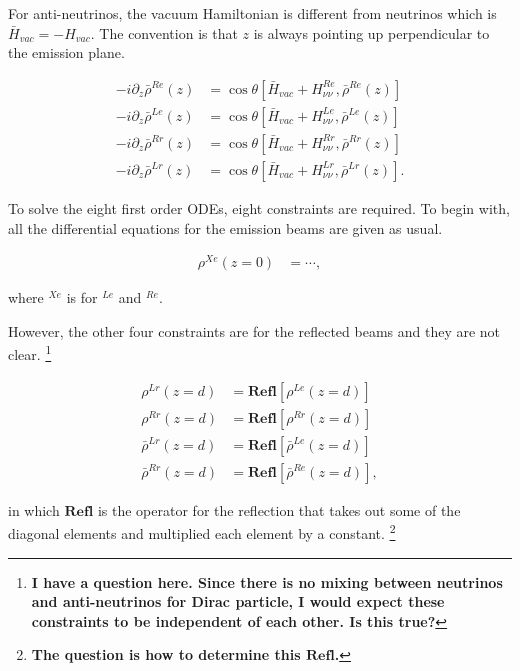 \documentclass{tufte-handout}
\begin{document}
For anti-neutrinos, the vacuum Hamiltonian is different from neutrinos which is $\bar H_{vac} = - H_{vac}$. The convention is that $z$ is always pointing up perpendicular to the emission plane.

\begin{align}
- i \partial_z \bar \rho^{Re}(z) & = \cos\theta \left[ \bar H_{vac} + H_{\nu\nu}^{Re} , \bar \rho^{Re}(z)  \right] \\
- i\partial_z \bar\rho^{Le}(z) &= \cos\theta \left[\bar H_{vac} + H_{\nu\nu}^{Le}, \bar\rho^{Le}(z) \right] \\
- i\partial_z \bar\rho^{Rr}(z) &= \cos\theta \left[\bar H_{vac} + H_{\nu\nu}^{Rr}, \bar\rho^{Rr}(z) \right] \\
- i\partial_z \bar \rho^{Lr}(z) &= \cos\theta \left[\bar H_{vac} + H_{\nu\nu}^{Lr}, \bar\rho^{Lr}(z) \right].
\end{align}




To solve the eight first order ODEs, eight constraints are required. To begin with, all the differential equations for the emission beams are given as usual. 

\begin{align}
\rho^{Xe}(z=0) &= \cdots ,
\end{align}

where ${}^{Xe}$ is for ${}^{Le}$ and ${}^{Re}$.

However, the other four constraints are for the reflected beams and they are not clear. \footnote{ {\bf{I have a question here. Since there is no mixing between neutrinos and anti-neutrinos for Dirac particle, I would expect these constraints to be independent of each other. Is this true?}} }

\begin{align}
\rho^{Lr}(z=d) & = \mathbf{Refl} [\rho^{Le}(z=d)] \\
\rho^{Rr}(z=d) & =  \mathbf{Refl} [ \rho^{Rr}(z=d) ]  \\
\bar\rho^{Lr}(z=d) & =  \mathbf{Refl} [\bar \rho^{Le}(z=d)] \\
\bar \rho^{Rr}(z=d) & =  \mathbf{Refl} [ \bar \rho^{Re}(z=d)],
\end{align}

in which $\mathbf{Refl}$ is the operator for the reflection that takes out some of the diagonal elements and multiplied each element by a constant. \footnote{{\bf The question is how to determine this $\mathbf{Refl}$.}}
\end{document}
